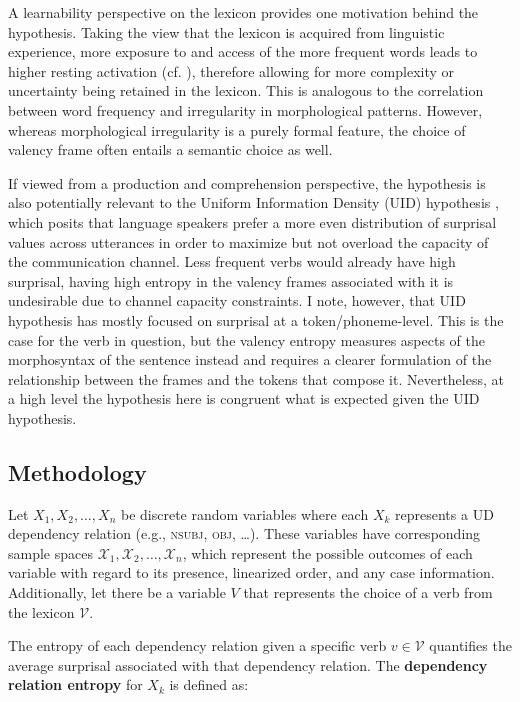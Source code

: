 A learnability perspective on the lexicon provides one motivation behind the hypothesis. Taking the view that the lexicon is acquired from linguistic experience, more exposure to and access of the more frequent words leads to higher resting activation (cf. \citealp*{bybee1998}), therefore allowing for more complexity or uncertainty being retained in the lexicon. This is analogous to the correlation between word frequency and irregularity in morphological patterns. However, whereas morphological irregularity is a purely formal feature, the choice of valency frame often entails a semantic choice as well.

If viewed from a production and comprehension perspective, the hypothesis is also potentially relevant to the Uniform Information Density (UID) hypothesis \citep{fenk1980,levy2006}, which posits that language speakers prefer a more even distribution of surprisal values across utterances in order to maximize but not overload the capacity of the communication channel. Less frequent verbs would already have high surprisal, having high entropy in the valency frames associated with it is undesirable due to channel capacity constraints. I note, however, that UID hypothesis has mostly focused on surprisal at a token/phoneme-level. This is the case for the verb in question, but the valency entropy measures aspects of the morphosyntax of the sentence instead and requires a clearer formulation of the relationship between the frames and the tokens that compose it. Nevertheless, at a high level the hypothesis here is congruent what is expected given the UID hypothesis.

\subsection{Methodology}

Let $X_1, X_2,\ldots,X_n$ be discrete random variables where each $X_k$ represents a UD dependency relation (e.g., \textsc{nsubj}, \textsc{obj}, \ldots). These variables have corresponding sample spaces $\mathcal{X}_1, \mathcal{X}_2, \ldots, \mathcal{X}_n$, which represent the possible outcomes of each variable with regard to its presence, linearized order, and any case information. Additionally, let there be a variable $V$ that represents the choice of a verb from the lexicon $\mathcal{V}$. 

The entropy of each dependency relation given a specific verb $v \in \mathcal{V}$ quantifies the average surprisal associated with that dependency relation. The \textbf{dependency relation entropy} for  $X_k$ is defined as:


